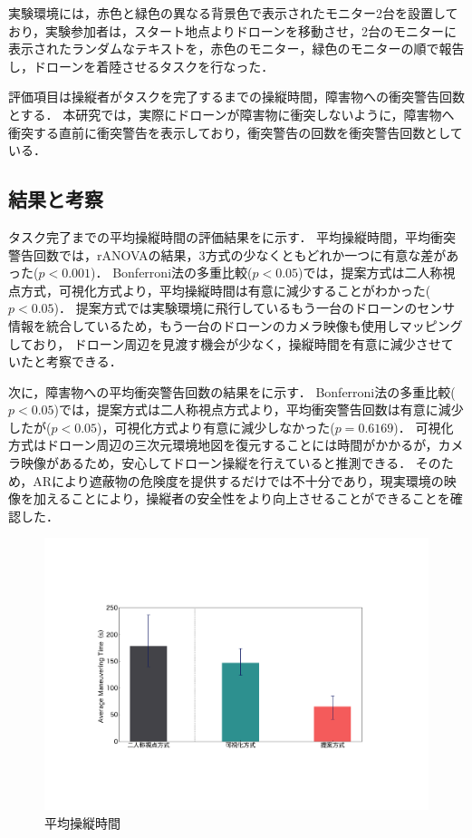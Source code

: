 \documentclass[a4paper,10pt,twocolumn,uplatex]{jsarticle}
\begin{document}
実験環境には，赤色と緑色の異なる背景色で表示されたモニター2台を設置しており，実験参加者は，スタート地点よりドローンを移動させ，2台のモニターに表示されたランダムなテキストを，赤色のモニター，緑色のモニターの順で報告し，ドローンを着陸させるタスクを行なった．

評価項目は操縦者がタスクを完了するまでの操縦時間，障害物への衝突警告回数とする．
本研究では，実際にドローンが障害物に衝突しないように，障害物へ衝突する直前に衝突警告を表示しており，衝突警告の回数を衝突警告回数としている．

\subsection{結果と考察}
タスク完了までの平均操縦時間の評価結果をに示す．
平均操縦時間，平均衝突警告回数では，rANOVAの結果，3方式の少なくともどれか一つに有意な差があった($p < 0.001 $)．
Bonferroni法の多重比較($p < 0.05$)では，提案方式は二人称視点方式，可視化方式より，平均操縦時間は有意に減少することがわかった($p < 0.05$)．
提案方式では実験環境に飛行しているもう一台のドローンのセンサ情報を統合しているため，もう一台のドローンのカメラ映像も使用しマッピングしており，
ドローン周辺を見渡す機会が少なく，操縦時間を有意に減少させていたと考察できる．

次に，障害物への平均衝突警告回数の結果をに示す．
Bonferroni法の多重比較($p < 0.05$)では，提案方式は二人称視点方式より，平均衝突警告回数は有意に減少したが($p < 0.05$)，可視化方式より有意に減少しなかった($p = 0.6169$)．
可視化方式はドローン周辺の三次元環境地図を復元することには時間がかかるが，カメラ映像があるため，安心してドローン操縦を行えていると推測できる．
そのため，ARにより遮蔽物の危険度を提供するだけでは不十分であり，現実環境の映像を加えることにより，操縦者の安全性をより向上させることができることを確認した．

\begin{figure}[!tb]
  \centering
  \includegraphics[width=0.9\linewidth]{img/05_time.pdf}
  \caption{平均操縦時間}
  \label{fig:05_time}
\end{figure}
\end{document}
